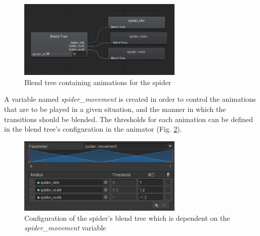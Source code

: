 \begin{figure}[h!]
    \centering
    \includegraphics[width=0.7\textwidth]{grafika/spider_blend.eps}
    \caption{Blend tree containing animations for the spider}
    \label{fig:s_blendtree}
\end{figure}

A variable named \textit{spider\_movement} is created in order to control the
animations that are to be played in a given situation, and the manner in which
the transitions should be blended. The thresholds for each animation can be
defined in the blend tree's configuration in the animator (Fig. \ref{fig:s_blendconf}).

\begin{figure}[h!]
    \centering
    \captionsetup{justification=centering}
    \includegraphics[width=0.7\textwidth]{grafika/spider_blendconf.eps}
    \caption{Configuration of the spider's blend tree which is dependent on
    the \textit{spider\_movement} variable}
    \label{fig:s_blendconf}
\end{figure}

